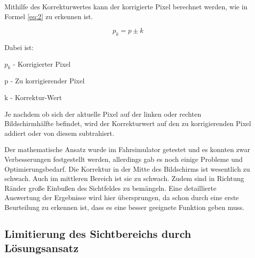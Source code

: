 Mithilfe des Korrekturwertes kann der korrigierte Pixel berechnet werden, wie in Formel \ref{eq:2} zu erkennen ist.  

\begin{equation} \label{eq:2}
	p_{k} =  p \pm k
\end{equation}

Dabei ist: 
\begin{center}
	$p_{k}$ - Korrigierter Pixel \par
	p - Zu korrigierender Pixel \par
	k - Korrektur-Wert\par
\end{center}

Je nachdem ob sich der aktuelle Pixel auf der linken oder rechten Bildschirmhälfte befindet, wird der Korrekturwert auf den zu korrigierenden Pixel addiert oder von diesem subtrahiert. 


Der mathematische Ansatz wurde im Fahrsimulator getestet und es konnten zwar Verbesserungen festgestellt werden, allerdings gab es noch einige Probleme und Optimierungsbedarf. Die Korrektur in der Mitte des Bildschirms ist wesentlich zu schwach. Auch im mittleren Bereich ist sie zu schwach. Zudem sind in Richtung Ränder große Einbußen des Sichtfeldes zu bemängeln. Eine detaillierte Auswertung der Ergebnisse wird hier übersprungen, da schon durch eine erste Beurteilung zu erkennen ist, dass es eine besser geeignete Funktion geben muss. 

\subsection{Limitierung des Sichtbereichs durch Lösungsansatz}

